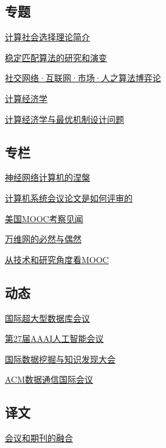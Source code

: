 \documentclass[a4paper]{article}
\begin{document}
\subsection{专题}
\href{http://history.ccf.org.cn/resources/1190201776262/2013/10/14/2.pdf}{计算社会选择理论简介}

\href{http://history.ccf.org.cn/resources/1190201776262/2013/10/14/3.pdf}{稳定匹配算法的研究和演变}

\href{http://history.ccf.org.cn/resources/1190201776262/2013/10/14/5.pdf}{社交网络·互联网·市场·人之算法博弈论}

\href{http://history.ccf.org.cn/resources/1190201776262/2013/10/18/1.pdf}{计算经济学}

\href{http://history.ccf.org.cn/resources/1190201776262/2013/10/14/4.pdf}{计算经济学与最优机制设计问题}

\subsection{专栏}
\href{http://history.ccf.org.cn/resources/1190201776262/2013/10/14/6.pdf}{神经网络计算机的涅槃}

\href{http://history.ccf.org.cn/resources/1190201776262/2013/10/14/7.pdf}{计算机系统会议论文是如何评审的}

\href{http://history.ccf.org.cn/resources/1190201776262/2013/10/14/9.pdf}{美国MOOC考察见闻}

\href{http://history.ccf.org.cn/resources/1190201776262/2013/10/14/8.pdf}{万维网的必然与偶然}

\href{http://history.ccf.org.cn/resources/1190201776262/2013/10/14/10.pdf}{从技术和研究角度看MOOC}

\subsection{动态}
\href{http://history.ccf.org.cn/resources/1190201776262/2013/10/14/13.pdf}{国际超大型数据库会议}

\href{http://history.ccf.org.cn/resources/1190201776262/2013/10/14/14.pdf}{第27届AAAI人工智能会议}

\href{http://history.ccf.org.cn/resources/1190201776262/2013/10/14/11.pdf}{国际数据挖掘与知识发现大会}

\href{http://history.ccf.org.cn/resources/1190201776262/2013/10/14/12.pdf}{ACM数据通信国际会议}

\subsection{译文}
\href{http://history.ccf.org.cn/resources/1190201776262/2013/10/18/15.pdf}{会议和期刊的融合}
\end{document}
